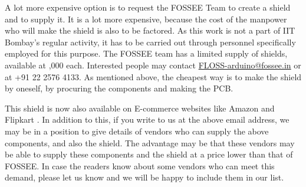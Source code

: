 A lot more expensive option is to request the FOSSEE Team to create a
shield and to supply it.  It is a lot more expensive, because the cost
of the manpower who will make the shield is also to be factored.  As
this work is not a part of IIT Bombay's regular activity, it has to be
carried out through personnel specifically employed for this purpose.
The FOSSEE team has a limited supply of shields, available at
,000 each.  Interested people may contact
\href{mailto:FLOSS-arduino@fossee.in}{FLOSS-arduino@fossee.in} or at
+91 22 2576 4133.  As mentioned above, the cheapest way is to make the
shield by oneself, by procuring the components and making the PCB.

This shield is now also available on E-commerce websites like Amazon \cite{amazon-shield} and Flipkart \cite{flipkart-shield}. In addition to this, if you write to us at the above email address, we may be in a position to give details of vendors who can supply the above components, and
also the shield.  The advantage may be that these vendors may be able
to supply these components and the shield at a price lower than that
of FOSSEE. In case the readers know about some vendors who can meet
this demand, please let us know and we will be happy to include them
in our list.



